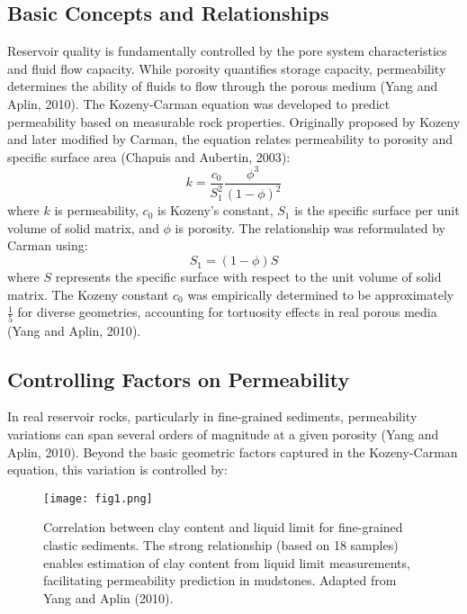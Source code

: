 \documentclass[journal]{IEEEtran}
\begin{document}
\subsection{Basic Concepts and Relationships}
Reservoir quality is fundamentally controlled by the pore system characteristics and fluid flow capacity. While porosity quantifies storage capacity, permeability determines the ability of fluids to flow through the porous medium (Yang and Aplin, 2010\cite{yang_permeabilityporosity_2010}).
The Kozeny-Carman equation was developed to predict permeability based on measurable rock properties. Originally proposed by Kozeny and later modified by Carman, the equation relates permeability to porosity and specific surface area (Chapuis and Aubertin, 2003\cite{chapuis_use_2003}):
\begin{equation}
k = \frac{c_0}{S_1^2}\frac{\phi^3}{(1-\phi)^2}
\end{equation}
\noindent where $k$ is permeability, $c_0$ is Kozeny's constant, $S_1$ is the specific surface per unit volume of solid matrix, and $\phi$ is porosity. The relationship was reformulated by Carman using:
\begin{equation}
S_1 = (1-\phi)S
\end{equation}
\noindent where $S$ represents the specific surface with respect to the unit volume of solid matrix. The Kozeny constant $c_0$ was empirically determined to be approximately $\frac{1}{5}$ for diverse geometries, accounting for tortuosity effects in real porous media (Yang and Aplin, 2010\cite{yang_permeabilityporosity_2010}).

\subsection{Controlling Factors on Permeability}

In real reservoir rocks, particularly in fine-grained sediments, permeability variations can span several orders of magnitude at a given porosity (Yang and Aplin, 2010\cite{yang_permeabilityporosity_2010}). Beyond the basic geometric factors captured in the Kozeny-Carman equation, this variation is controlled by:

\begin{figure}[t]
    \centering
    \texttt{[image: fig1.png]}
    \caption{Correlation between clay content and liquid limit for fine-grained clastic sediments. The strong relationship (based on 18 samples) enables estimation of clay content from liquid limit measurements, facilitating permeability prediction in mudstones. Adapted from Yang and Aplin (2010).}
    \label{fig:clay_liquid}
\end{figure}
\end{document}
